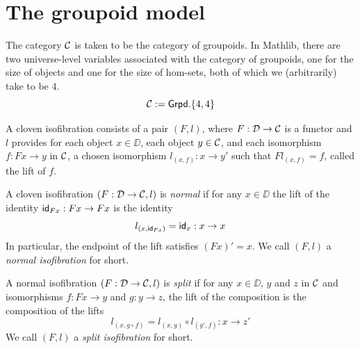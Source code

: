 \section{The groupoid model}

\begin{definition}
The category $\mathcal{C}$ is taken to be the category of groupoids.
In Mathlib, there are two universe-level variables
associated with the category of groupoids,
one for the size of objects and one for the size of hom-sets,
both of which we (arbitrarily) take to be $4$.
\[ \mathcal{C} := \mathsf{Grpd}.\{4,4\} \]
\end{definition}

\begin{definition}\label{def:split-isofibration}
  A cloven isofibration consists of a pair $(F,l)$,
  where $F : \mathcal{D} \to \mathcal{C}$ is a functor
  and $l$ provides for each object $x \in \DD$, each object $y \in \mathcal{C}$,
  and each isomorphism $f : F x \to y$ in $\mathcal{C}$,
  a chosen isomorphism $l_{(x,f)} : x \to y'$
  such that $F l_{(x,f)} = f$,
  called the lift of $f$.

  A cloven isofibration $(F : \mathcal{D} \to \mathcal{C},l)$
  is \emph{normal} if 
  for any $x \in \DD$ the lift of the identity
  $\mathsf{id}_{F x} : F x \to F x$ is the identity
  \[l_{(x,\mathsf{id}_{F x})} = \mathsf{id}_x : x \to x\]
  In particular, the endpoint of the lift satisfies $(F x)' = x$.
  We call $(F,l)$ a \emph{normal isofibration} for short.

  A normal isofibration $(F : \mathcal{D} \to \mathcal{C}, l)$ is \emph{split} if
  for any $x \in \DD$, $y$ and $z$ in $\mathcal{C}$ and
  isomorphisms $f : F x \to y$ and $g : y \to z$,
  the lift of the composition is the composition of the lifts
  \[l_{(x,g \circ f)} = l_{(x,g)} \circ l_{(y',f)} : x \to z' \]
  We call $(F,l)$ a \emph{split isofibration} for short.
\end{definition}

